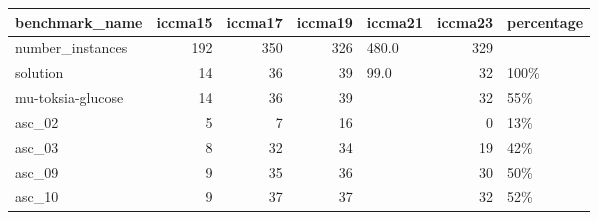 \begin{tabular}{lrrrlrl}
\toprule
benchmark\_name &  iccma15 &  iccma17 &  iccma19 & iccma21 &  iccma23 & percentage \\
\midrule
number\_instances  &      192 &      350 &      326 &   480.0 &      329 &            \\
solution          &       14 &       36 &       39 &    99.0 &       32 &       100\% \\
mu-toksia-glucose &       14 &       36 &       39 &         &       32 &        55\% \\
asc\_02            &        5 &        7 &       16 &         &        0 &        13\% \\
asc\_03            &        8 &       32 &       34 &         &       19 &        42\% \\
asc\_09            &        9 &       35 &       36 &         &       30 &        50\% \\
asc\_10            &        9 &       37 &       37 &         &       32 &        52\% \\
\bottomrule
\end{tabular}
